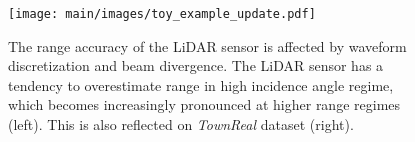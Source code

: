\begin{figure}[t]
\centering
\texttt{[image: main/images/toy\_example\_update.pdf]}
\caption{The range accuracy of the LiDAR sensor is affected by waveform discretization and beam divergence. %
The LiDAR sensor has a tendency to overestimate range in high incidence angle regime, which becomes increasingly pronounced at higher range regimes (left). This is also reflected on \textit{TownReal} dataset (right).}
\label{fig:iccv_toy_example}
\end{figure}